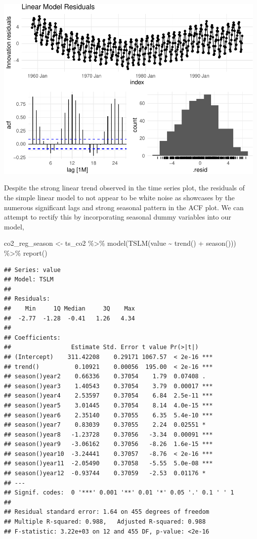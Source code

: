 \documentclass[AER]{AEA}
\newenvironment{Shaded}{\begin{snugshade}}{\end{snugshade}}
\newcommand{\FunctionTok}[1]{\textcolor[rgb]{0.00,0.00,0.00}{#1}}
\newcommand{\NormalTok}[1]{#1}
\newcommand{\OtherTok}[1]{\textcolor[rgb]{0.56,0.35,0.01}{#1}}
\newcommand{\SpecialCharTok}[1]{\textcolor[rgb]{0.00,0.00,0.00}{#1}}
\begin{document}
\includegraphics{co2_1997_Qian_files/figure-latex/linear model residuals-1.pdf}

Despite the strong linear trend observed in the time series plot, the
residuals of the simple linear model to not appear to be white noise as
showcases by the numerous significant lags and strong seasonal pattern
in the ACF plot. We can attempt to rectify this by incorporating
seasonal dummy variables into our model,

\begin{Shaded}
\begin{Highlighting}[]
\NormalTok{co2\_reg\_season }\OtherTok{\textless{}{-}}\NormalTok{ ts\_co2 }\SpecialCharTok{\%\textgreater{}\%} 
    \FunctionTok{model}\NormalTok{(}\FunctionTok{TSLM}\NormalTok{(value }\SpecialCharTok{\textasciitilde{}} \FunctionTok{trend}\NormalTok{() }\SpecialCharTok{+} \FunctionTok{season}\NormalTok{())) }\SpecialCharTok{\%\textgreater{}\%}
  \FunctionTok{report}\NormalTok{()}
\end{Highlighting}
\end{Shaded}

\begin{verbatim}
## Series: value 
## Model: TSLM 
## 
## Residuals:
##    Min     1Q Median     3Q    Max 
##  -2.77  -1.28  -0.41   1.26   4.34 
## 
## Coefficients:
##                 Estimate Std. Error t value Pr(>|t|)    
## (Intercept)    311.42208    0.29171 1067.57  < 2e-16 ***
## trend()          0.10921    0.00056  195.00  < 2e-16 ***
## season()year2    0.66336    0.37054    1.79  0.07408 .  
## season()year3    1.40543    0.37054    3.79  0.00017 ***
## season()year4    2.53597    0.37054    6.84  2.5e-11 ***
## season()year5    3.01445    0.37054    8.14  4.0e-15 ***
## season()year6    2.35140    0.37055    6.35  5.4e-10 ***
## season()year7    0.83039    0.37055    2.24  0.02551 *  
## season()year8   -1.23728    0.37056   -3.34  0.00091 ***
## season()year9   -3.06162    0.37056   -8.26  1.6e-15 ***
## season()year10  -3.24441    0.37057   -8.76  < 2e-16 ***
## season()year11  -2.05490    0.37058   -5.55  5.0e-08 ***
## season()year12  -0.93744    0.37059   -2.53  0.01176 *  
## ---
## Signif. codes:  0 '***' 0.001 '**' 0.01 '*' 0.05 '.' 0.1 ' ' 1
## 
## Residual standard error: 1.64 on 455 degrees of freedom
## Multiple R-squared: 0.988,   Adjusted R-squared: 0.988
## F-statistic: 3.22e+03 on 12 and 455 DF, p-value: <2e-16
\end{verbatim}
\end{document}
